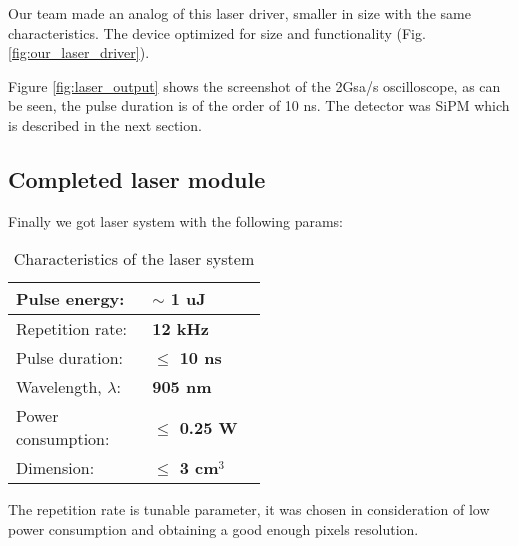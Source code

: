 


Our team made an analog of this laser driver, smaller in size with the same characteristics. The device optimized for size and functionality (Fig. \ref{fig:our_laser_driver}).

Figure \ref{fig:laser_output} shows the screenshot of the 2Gsa/s oscilloscope, as can be seen, the pulse duration is of the order of 10 ns. The detector was SiPM which is described in the next section.

\begin{figure}
\begin{floatrow}
\end{floatrow}
\end{figure}






\subsection{Completed laser module}

Finally we got laser system with the following params:

\begin{table}[H]
\label{tbl:rfp_laser}
\begin{center}
\begin{tabular}{|p{0.2\linewidth}|p{0.3\linewidth}|}
\hline
Pulse energy: & \textbf{$\sim$ 1 uJ}  \\ \hline
Repetition rate: & \textbf{12 kHz} \\\hline
Pulse duration: & \textbf{$\leq$ 10 ns} \\\hline
Wavelength, $\lambda$: & \textbf{905 nm} \\\hline
Power consumption: & \textbf{$\leq$ 0.25 W} \\  \hline
Dimension: & \textbf{$\leq$ 3 cm$^3$} \\  \hline
\end{tabular}
\caption{Characteristics of the laser system}
\end{center}
\end{table}


The repetition rate is tunable parameter, it was chosen in consideration of low power consumption and obtaining a good enough pixels resolution.

